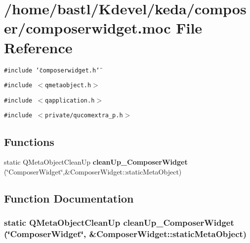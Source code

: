 \section{/home/bastl/Kdevel/keda/composer/composerwidget.moc File Reference}
\label{composerwidget_8moc}
{\tt \#include \char`\"{}composerwidget.h\char`\"{}}\par
{\tt \#include $<$qmetaobject.h$>$}\par
{\tt \#include $<$qapplication.h$>$}\par
{\tt \#include $<$private/qucomextra\_\-p.h$>$}\par
\subsection*{Functions}
\begin{CompactItemize}
\item 
static QMeta\-Object\-Clean\-Up {\bf clean\-Up\_\-Composer\-Widget} (\char`\"{}Composer\-Widget\char`\"{},\&Composer\-Widget::static\-Meta\-Object)
\end{CompactItemize}


\subsection{Function Documentation}
\subsubsection{\setlength{\rightskip}{0pt plus 5cm}static QMeta\-Object\-Clean\-Up clean\-Up\_\-Composer\-Widget (\char`\"{}Composer\-Widget\char`\"{}, \&Composer\-Widget::static\-Meta\-Object)\hspace{0.3cm}{\tt  [static]}}\label{composerwidget_8moc_445e67147d21ac32092b810d367fc769}


